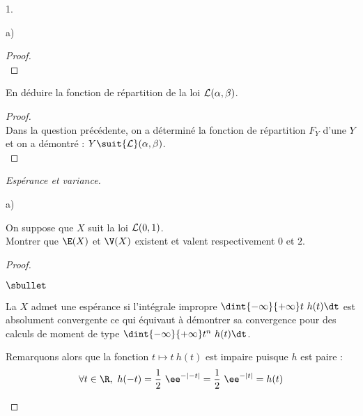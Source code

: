 \documentclass[11pt]{article}%
\begin{document}
\begin{noliste}{1.}
\begin{noliste}{a)}
\begin{proof}
        
    ~\\[-1.4cm]
  \end{proof}
  
  
  
  
  
  
\item En déduire la fonction de répartition de la loi ${\cal
    L}(\alpha,\beta)$.
  
  \begin{proof}~\\%
    Dans la question précédente, on a déterminé la fonction de
    répartition $F_Y$ d'une \var $Y$ et on a démontré : $Y \suit {\cal
      L}(\alpha, \beta)$.%
    ~\\[-1cm]
  \end{proof}
\end{noliste}

\item {\em Espérance et variance.}
  \begin{noliste}{a)}
  \setlength{\itemsep}{2mm} %
  \item On suppose que $X$ suit la loi ${\cal L}(0,1)$.\\
    Montrer que $\E(X)$ et $\V(X)$ existent et valent respectivement
    $0$ et $2$.

    \begin{proof}~%
      \begin{noliste}{$\sbullet$}
      \item La \var $X$ admet une espérance si l'intégrale impropre
        $\dint{-\infty}{+\infty} t \ h(t) \dt$ est absolument
        convergente ce qui équivaut à démontrer sa convergence pour
        des calculs de moment de type $\dint{-\infty}{+\infty} t^n \
        h(t) \dt$.

      \item Remarquons alors que la fonction $t \mapsto t \ h(t)$ est
        impaire puisque $h$ est paire :
        \[
        \forall t \in \R, \ h(-t) = \dfrac{1}{2} \ \ee^{-|-t|} =
        \dfrac{1}{2} \ \ee^{-|t|} = h(t)
        \]
        

\end{noliste}
\end{proof}
\end{noliste}
\end{noliste}
\end{document}

